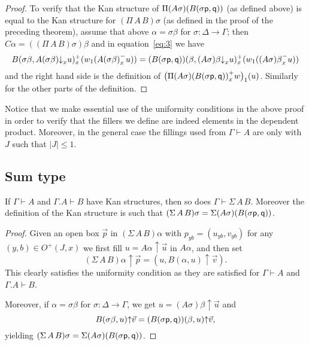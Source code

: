 \documentclass[a4paper,USenglish,draft]{lipics}
\newcommand{\pp}{{\sf p}}
\newcommand{\qq}{{\sf q}}
\newcommand{\rup}[1]{#1{\uparrow}}
\newcommand{\rdo}[1]{#1{\downarrow}}
\begin{document}
\begin{proof}
  To verify that the Kan structure of $\Pi (A \sigma) (B (\sigma \pp,
  \qq))$ (as defined above) is equal to the Kan structure for
  $(\Pi\,A\,B) \sigma$ (as defined in the proof of the preceding
  theorem), assume that above $\alpha = \sigma \beta$ for $\sigma
  \colon \Delta \to \Gamma$; then $C \alpha = ((\Pi\,A\,B) \sigma)
  \beta$ and in equation~\eqref{eq:3} we have
  \[
  B(\sigma \beta,\rdo{A(\sigma \beta)}_x u)^+_x (w_1 ({A(\sigma
    \beta)}^-_x u)) = (B (\sigma \pp, \qq)) (\beta, \rdo{(A\sigma)
    \beta}_x u)^+_x (w_1 ({(A \sigma) \beta}^-_x u))
  \]
  and the right hand side is the definition of $\bigl({\Pi(A \sigma)
    (B (\sigma \pp, \qq))}^+_x w\bigr)_1 (u)$.  Similarly for the
  other parts of the definition.
\end{proof}

Notice that we make essential use of the uniformity conditions in the
above proof in order to verify that the fillers we define are indeed
elements in the dependent product.  Moreover, in the general case the
fillings used from $\Gamma \vdash A$ are only with $J$ such that
$\lvert J \rvert \leq 1$.

\subsection{Sum type}

\begin{theorem}
  If $\Gamma \vdash A$ and $\Gamma.A \vdash B$ have Kan structures,
  then so does $\Gamma \vdash \Sigma\,A\,B$.  Moreover the definition
  of the Kan structure is such that $(\Sigma\,A\,B) \sigma = \Sigma (A
  \sigma) (B (\sigma \pp, \qq))$.
\end{theorem}
\begin{proof}
  Given an open box $\vec p$ in $(\Sigma\,A\,B) \alpha$ with
  $p_{yb}=(u_{yb},v_{yb})$ for any $(y,b)\in O^+(J,x)$ we first fill
  $u = \rup {A \alpha} {\vec u}$ in $A \alpha$, and then set
  \[
  \rup{(\Sigma\,A\,B) \alpha} {\vec p} = (u, \rup {B (\alpha, u)}
  {\vec v}).
  \]
  This clearly satisfies the uniformity condition as they are
  satisfied for $\Gamma \vdash A$ and $\Gamma.A \vdash B$.

  Moreover, if $\alpha = \sigma \beta$ for $\sigma \colon \Delta \to
  \Gamma$, we get $u = \rup {(A \sigma) \beta} {\vec u}$ and
  \[
  \rup {B (\sigma \beta, u)} {\vec v} = \rup{(B (\sigma \pp, \qq))
    (\beta, u)} {\vec v},
  \]
  yielding $(\Sigma\,A\,B) \sigma = \Sigma (A
  \sigma) (B (\sigma \pp, \qq))$.
\end{proof}
\end{document}
